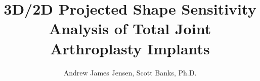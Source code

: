 \documentclass[12pt]{article}
\begin{document}
\linenumbers
\title{3D/2D Projected Shape Sensitivity Analysis of Total Joint Arthroplasty Implants}
\author{Andrew James Jensen, Scott Banks, Ph.D.}
\date{}

\maketitle








\printbibliography
\end{document}
